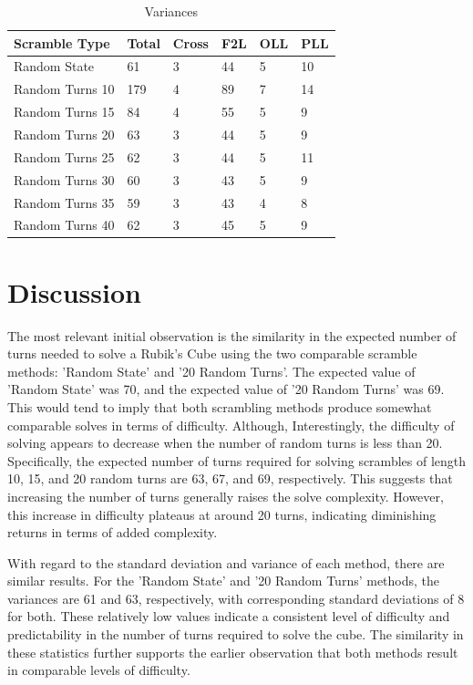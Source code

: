 \documentclass[12pt,letterpaper]{article}
\numberwithin{equation}{section}
\begin{document}
\begin{table}[H]
\centering
\caption{Variances}
\begin{tabular}{|p{4cm}|p{1.5cm}|p{1.5cm}|p{1.5cm}|p{1.5cm}|p{1.5cm}|}
\hline
\textbf{Scramble Type} & \textbf{Total} & \textbf{Cross} & \textbf{F2L} & \textbf{OLL} & \textbf{PLL} \\ \hline
Random State & 61 & 3 & 44 & 5 & 10 \\ \hdashline
Random Turns 10 & 179 & 4 & 89 & 7 & 14 \\
Random Turns 15 & 84 & 4 & 55 & 5 & 9 \\
Random Turns 20 & 63 & 3 & 44 & 5 & 9 \\
Random Turns 25 & 62 & 3 & 44 & 5 & 11 \\
Random Turns 30 & 60 & 3 & 43 & 5 & 9 \\
Random Turns 35 & 59 & 3 & 43 & 4 & 8 \\
Random Turns 40 & 62 & 3 & 45 & 5 & 9 \\ \hline
\end{tabular}
\end{table}


\newpage

\section{Discussion}

The most relevant initial observation is the similarity in the expected number of turns needed to solve a Rubik's Cube using the two comparable scramble methods: 'Random State' and '20 Random Turns'. The expected value of 'Random State' was 70, and the expected value of '20 Random Turns' was 69. This would tend to imply that both scrambling methods produce somewhat comparable solves in terms of difficulty. Although, Interestingly, the difficulty of solving appears to decrease when the number of random turns is less than 20. Specifically, the expected number of turns required for solving scrambles of length 10, 15, and 20 random turns are 63, 67, and 69, respectively. This suggests that increasing the number of turns generally raises the solve complexity. However, this increase in difficulty plateaus at around 20 turns, indicating diminishing returns in terms of added complexity.

With regard to the standard deviation and variance of each method, there are similar results. For the 'Random State' and '20 Random Turns' methods, the variances are 61 and 63, respectively, with corresponding standard deviations of 8 for both. These relatively low values indicate a consistent level of difficulty and predictability in the number of turns required to solve the cube. The similarity in these statistics further supports the earlier observation that both methods result in comparable levels of difficulty.
\end{document}
